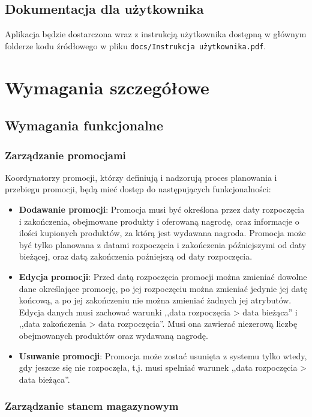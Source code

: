 \documentclass[a4paper,12pt]{article}
\begin{document}
\subsection{Dokumentacja dla użytkownika}

Aplikacja będzie dostarczona wraz z instrukcją użytkownika dostępną w głównym folderze kodu źródłowego w pliku \texttt{docs/Instrukcja użytkownika.pdf}.

\section{Wymagania szczegółowe}

\subsection{Wymagania funkcjonalne}

\subsubsection{Zarządzanie promocjami}

Koordynatorzy promocji, którzy definiują i nadzorują proces planowania i przebiegu promocji, będą mieć dostęp do następujących funkcjonalności:
\begin{itemize}
    \item \textbf{Dodawanie promocji}:
    Promocja musi być określona przez daty rozpoczęcia i zakończenia, obejmowane produkty i oferowaną nagrodę, oraz informacje o ilości kupionych produktów, za którą jest wydawana nagroda.
    Promocja może być tylko planowana z datami rozpoczęcia i zakończenia późniejszymi od daty bieżącej, oraz datą zakończenia poźniejszą od daty rozpoczęcia. 
    \item \textbf{Edycja promocji}:
    Przed datą rozpoczęcia promocji można zmieniać dowolne dane określające promocję, po jej rozpoczęciu można zmieniać jedynie jej datę końcową, a po jej zakończeniu nie można zmieniać żadnych jej atrybutów.
    Edycja danych musi zachować warunki ,,data rozpoczęcia > data bieżąca'' i ,,data zakończenia > data rozpoczęcia''.
    Musi ona zawierać niezerową liczbę obejmowanych produktów oraz wydawaną nagrodę.
    \item \textbf{Usuwanie promocji}:
    Promocja może zostać usunięta z systemu tylko wtedy, gdy jeszcze się nie rozpoczęła, t.j. musi spełniać warunek ,,data rozpoczęcia > data bieżąca''.
\end{itemize}

\subsubsection{Zarządzanie stanem magazynowym}
\end{document}
